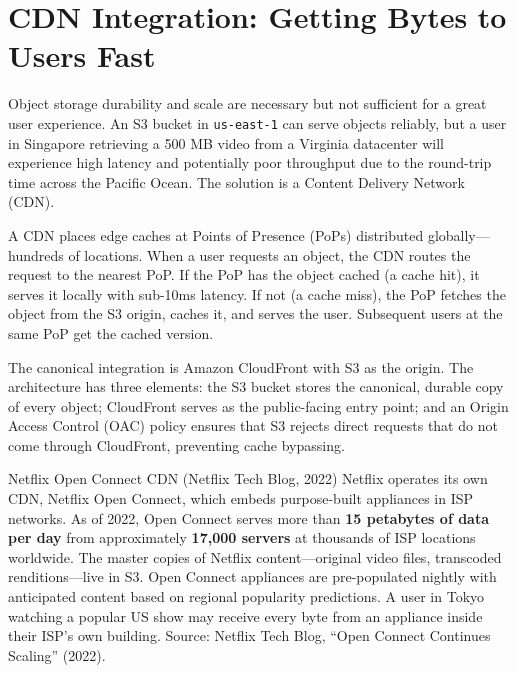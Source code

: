 \documentclass[11pt,a4paper]{article}
\begin{document}
\section{CDN Integration: Getting Bytes to Users Fast}

Object storage durability and scale are necessary but not sufficient for a great user experience. An S3 bucket in \texttt{us-east-1} can serve objects reliably, but a user in Singapore retrieving a 500 MB video from a Virginia datacenter will experience high latency and potentially poor throughput due to the round-trip time across the Pacific Ocean. The solution is a Content Delivery Network (CDN).

A CDN places edge caches at Points of Presence (PoPs) distributed globally---hundreds of locations. When a user requests an object, the CDN routes the request to the nearest PoP. If the PoP has the object cached (a cache hit), it serves it locally with sub-10ms latency. If not (a cache miss), the PoP fetches the object from the S3 origin, caches it, and serves the user. Subsequent users at the same PoP get the cached version.

The canonical integration is Amazon CloudFront with S3 as the origin. The architecture has three elements: the S3 bucket stores the canonical, durable copy of every object; CloudFront serves as the public-facing entry point; and an Origin Access Control (OAC) policy ensures that S3 rejects direct requests that do not come through CloudFront, preventing cache bypassing.

\begin{industrybox}{Netflix Open Connect CDN (Netflix Tech Blog, 2022)}
Netflix operates its own CDN, Netflix Open Connect, which embeds purpose-built appliances in ISP networks. As of 2022, Open Connect serves more than \textbf{15 petabytes of data per day} from approximately \textbf{17,000 servers} at thousands of ISP locations worldwide. The master copies of Netflix content---original video files, transcoded renditions---live in S3. Open Connect appliances are pre-populated nightly with anticipated content based on regional popularity predictions. A user in Tokyo watching a popular US show may receive every byte from an appliance inside their ISP's own building. Source: Netflix Tech Blog, ``Open Connect Continues Scaling'' (2022).
\end{industrybox}
\end{document}
